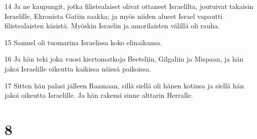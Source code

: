 \par 14 Ja ne kaupungit, jotka filistealaiset olivat ottaneet Israelilta, joutuivat takaisin Israelille, Ekronista Gatiin saakka; ja myös niiden alueet Israel vapautti filistealaisten käsistä. Myöskin Israelin ja amorilaisten välillä oli rauha.
\par 15 Samuel oli tuomarina Israelissa koko elinaikansa.
\par 16 Ja hän teki joka vuosi kiertomatkoja Beeteliin, Gilgaliin ja Mispaan, ja hän jakoi Israelille oikeutta kaikissa näissä paikoissa.
\par 17 Sitten hän palasi jälleen Raamaan, sillä siellä oli hänen kotinsa ja siellä hän jakoi oikeutta Israelille. Ja hän rakensi sinne alttarin Herralle.

\chapter{8}

